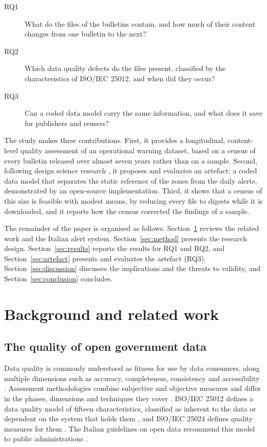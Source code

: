 \documentclass[review,authoryear,12pt]{elsarticle}
\begin{document}
\begin{description}
\item[RQ1] What do the files of the bulletins contain, and how much of their
content changes from one bulletin to the next?
\item[RQ2] Which data quality defects do the files present, classified by the
characteristics of ISO/IEC 25012, and when did they occur?
\item[RQ3] Can a coded data model carry the same information, and what does it
save for publishers and reusers?
\end{description}

The study makes three contributions. First, it provides a longitudinal,
content-level quality assessment of an operational warning dataset, based on a
census of every bulletin released over almost seven years rather than on a
sample. Second, following design science research
\citep{hevner2004,peffers2007}, it proposes and evaluates an artefact: a coded
data model that separates the static reference of the zones from the daily
alerts, demonstrated by an open-source implementation. Third, it shows that a
census of this size is feasible with modest means, by reducing every file to
digests while it is downloaded, and it reports how the census corrected the
findings of a sample.

The remainder of the paper is organised as follows.
Section~\ref{sec:background} reviews the related work and the Italian alert
system. Section~\ref{sec:method} presents the research design.
Section~\ref{sec:results} reports the results for RQ1 and RQ2, and
Section~\ref{sec:artefact} presents and evaluates the artefact (RQ3).
Section~\ref{sec:discussion} discusses the implications and the threats to
validity, and Section~\ref{sec:conclusion} concludes.

\section{Background and related work}
\label{sec:background}

\subsection{The quality of open government data}

Data quality is commonly understood as fitness for use by data consumers,
along multiple dimensions such as accuracy, completeness, consistency and
accessibility \citep{wang1996}. Assessment methodologies combine subjective
and objective measures \citep{pipino2002} and differ in the phases,
dimensions and techniques they cover \citep{batini2009}. ISO/IEC 25012 defines
a data quality model of fifteen characteristics, classified as inherent to the
data or dependent on the system that holds them \citep{iso25012}, and ISO/IEC
25024 defines quality measures for them \citep{iso25024}. The Italian
guidelines on open data recommend this model to public administrations
\citep[section 5.3]{agid2023}.
\end{document}
